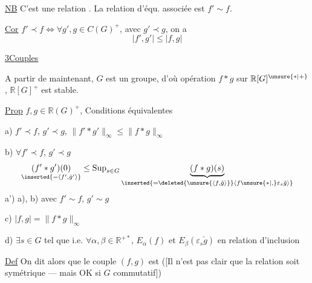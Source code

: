 \uline{NB} C'est une relation  . La relation d'équ. associée est $f'\sim f$.


\uline{Cor} $f'\prec f\Longleftrightarrow\forall g',g\in C(G)^+$, avec $g'\prec g$, on a
\[
|f',g'|\leq|f,g|
\]

\uline{3}\quad\uline{Couples }

A partir de maintenant, $G$ est un groupe, d'où opération $f\ast g$ sur $\mathbb R[G]^{\unsure{\ast|+}}$, $\mathbb R[G]^+$ est stable.


\uline{Prop} $f,g\in\mathbb R(G)^+$, Conditions équivalentes

a) $f'\prec f$, $g'\prec g$, $\|f'\ast g'\|_\infty\leq\|f\ast g\|_\infty$

b) $\forall f'\prec f$, $g'\prec g$
\[
\underset{\inserted{=\langle f',\check g'\rangle}}{(f'\ast g')(0)}
\leq\operatorname{Sup}_{s\in G}
\underbrace{(f\ast g)(s)}_{\inserted{=\deleted{\unsure{\langle f,\check g\rangle}}\langle f\unsure{\ast|,}\varepsilon_s\check g\rangle}}
\]
a')  a), b) avec $f'\sim f$, $g'\sim g$

c) $|f,g|=\|f\ast g\|_\infty$

d) $\exists s\in G$ tel que
i.e. $\forall\alpha,\beta\in\mathbb R^{+\ast}$, $E_\alpha(f)$ et $E_\beta(\varepsilon_s\check g)$ en relation d'inclusion

\uline{Def} On dit alors que le couple $(f,g)$ est \uline{}
([Il n'est pas clair que la relation soit symétrique ---  mais OK si $G$ commutatif])

